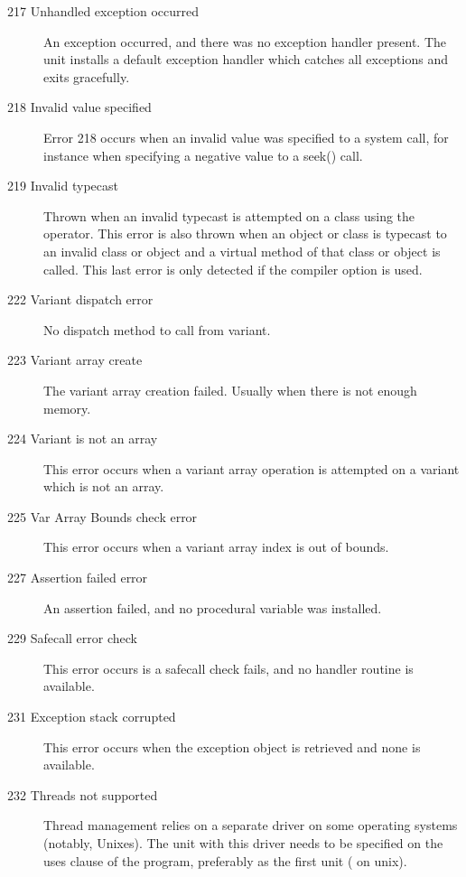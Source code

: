 \begin{description}
\item [217 Unhandled exception occurred]
An exception occurred, and there was no exception handler present.
The  unit installs a default exception handler which catches
all exceptions and exits gracefully.

\item[218 Invalid value specified]
Error 218 occurs when an invalid value was specified to a system call,
for instance when specifying a negative value to a seek() call.

\item [219 Invalid typecast]

Thrown when an invalid typecast is attempted on a class using the 
operator. This error is also thrown when an object or class is
typecast to an invalid class or object and a virtual method of
that class or object is called. This last error is only detected
if the  compiler option is used.


\item[222 Variant dispatch error]
No dispatch method to call from variant.

\item[223 Variant array create]
The variant array creation failed. Usually when there is not enough memory.

\item[224 Variant is not an array]
This error occurs when a variant array operation is attempted on a variant
which is not an array.

\item[225 Var Array Bounds check error]
This error occurs when a variant array index is out of bounds.

\item [227 Assertion failed error]
An assertion failed, and no  procedural variable was 
installed.

\item [229 Safecall error check]
This error occurs is a safecall check fails, and no handler routine is
available.

\item [231 Exception stack corrupted]
This error occurs when the exception object is retrieved and none is
available.

\item [232 Threads not supported]
Thread management relies on a separate driver on some operating systems
(notably, Unixes). The unit with this driver needs to be specified on
the uses clause of the program, preferably as the first unit
( on unix).

\end{description}

